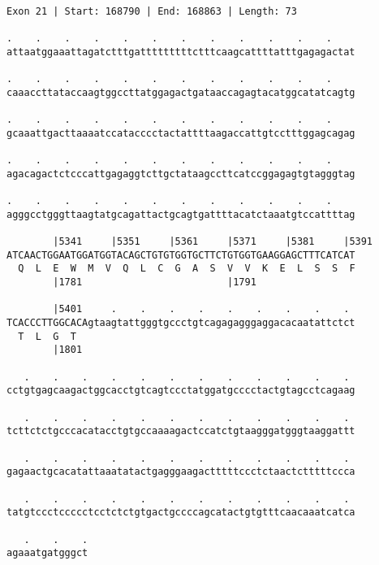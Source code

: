 \documentclass{article}
\begin{document}
\begin{Verbatim}[fontfamily=courier]
Exon 21 | Start: 168790 | End: 168863 | Length: 73

.    .    .    .    .    .    .    .    .    .    .    .    
attaatggaaattagatctttgatttttttttctttcaagcattttatttgagagactat

.    .    .    .    .    .    .    .    .    .    .    .    
caaaccttataccaagtggccttatggagactgataaccagagtacatggcatatcagtg

.    .    .    .    .    .    .    .    .    .    .    .    
gcaaattgacttaaaatccatacccctactattttaagaccattgtcctttggagcagag

.    .    .    .    .    .    .    .    .    .    .    .    
agacagactctcccattgagaggtcttgctataagccttcatccggagagtgtagggtag

.    .    .    .    .    .    .    .    .    .    .    .    
agggcctgggttaagtatgcagattactgcagtgattttacatctaaatgtccattttag

        |5341     |5351     |5361     |5371     |5381     |5391
ATCAACTGGAATGGATGGTACAGCTGTGTGGTGCTTCTGTGGTGAAGGAGCTTTCATCAT
  Q  L  E  W  M  V  Q  L  C  G  A  S  V  V  K  E  L  S  S  F
        |1781                         |1791                 

        |5401     .    .    .    .    .    .    .    .    . 
TCACCCTTGGCACAgtaagtattgggtgccctgtcagagagggaggacacaatattctct
  T  L  G  T                                                
        |1801                                               

   .    .    .    .    .    .    .    .    .    .    .    . 
cctgtgagcaagactggcacctgtcagtccctatggatgcccctactgtagcctcagaag

   .    .    .    .    .    .    .    .    .    .    .    . 
tcttctctgcccacatacctgtgccaaaagactccatctgtaagggatgggtaaggattt

   .    .    .    .    .    .    .    .    .    .    .    . 
gagaactgcacatattaaatatactgagggaagactttttccctctaactctttttccca

   .    .    .    .    .    .    .    .    .    .    .    . 
tatgtccctccccctcctctctgtgactgccccagcatactgtgtttcaacaaatcatca

   .    .    .
agaaatgatgggct
\end{Verbatim}
\newpage
\end{document}
